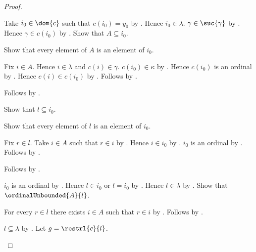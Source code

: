 \begin{proof}
\begin{subproof}
\begin{subproof}
            Take $i_0\in\dom{c}$ such that $c(i_0)=y_0$
                by .
            Hence $i_0\in\lambda$.
            $\gamma\in\suc{\gamma}$ by .
            Hence $\gamma\in c(i_0)$ by .
            Show that $A\subseteq i_0$.
            \begin{subproof}
                Show that every element of $A$ is an element of $i_0$.
                \begin{subproof}
                    Fix $i\in A$.
                    Hence $i\in\lambda$ and $c(i)\in\gamma$.
                    $c(i_0)\in\kappa$ by .
                    Hence $c(i_0)$ is an ordinal
                        by .
                    Hence $c(i)\in c(i_0)$
                        by .
                    Follows by
                        .
                \end{subproof}
                Follows by .
            \end{subproof}
            Show that $l\subseteq i_0$.
            \begin{subproof}
                Show that every element of $l$ is an element of $i_0$.
                \begin{subproof}
                    Fix $r\in l$.
                    Take $i\in A$ such that $r\in i$
                        by .
                    Hence $i\in i_0$ by .
                    $i_0$ is an ordinal
                        by .
                    Follows by .
                \end{subproof}
                Follows by .
            \end{subproof}
            $i_0$ is an ordinal by .
            Hence $l\in i_0$ or $l=i_0$
                by .
            Hence $l\in\lambda$ by .
            Show that $\ordinalUnbounded{A}{l}$.
            \begin{subproof}
                For every $r\in l$ there exists $i\in A$ such that
                    $r\in i$ by .
                Follows by .
            \end{subproof}
            $l\subseteq\lambda$ by .
            Let $g=\restrl{c}{l}$.

\end{subproof}
\end{subproof}
\end{proof}
